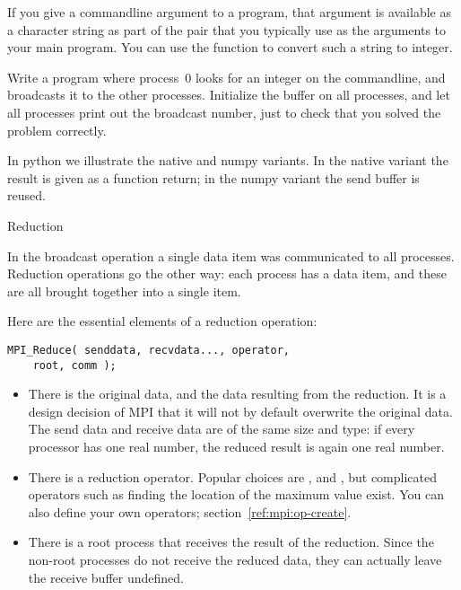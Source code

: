 

\begin{exercise}
  \label{ex:argv-bcast}
  If you give a commandline argument to a program, that argument is available
  as a character string as part of the  pair that you typically use
  as the arguments to your main program. You can use the function  to
  convert such a string to integer.

  Write a program where process~0 looks for an integer on the commandline, and
  broadcasts it to the other processes. Initialize the buffer on all processes, and
  let all processes print out the broadcast number,
  just to check that you solved the problem correctly.
\end{exercise}

In python we illustrate the native and numpy variants. In the native
variant the result is given as a function return; in the numpy variant
the send buffer is reused.
%

 {Reduction}

In the broadcast operation a single data item was communicated to all
processes. Reduction operations go the other way: each process has a
data item, and these are all brought together into a single item.

Here are the essential elements of a reduction operation:
\begin{verbatim}
MPI_Reduce( senddata, recvdata..., operator,
    root, comm ); 
\end{verbatim}
\begin{itemize}
\item There is the original data, and the data resulting from the
  reduction. It is a design decision of MPI that it will not by
  default overwrite the original data. The send data and receive data
  are of the same size and type: if every processor has one real
  number, the reduced result is again one real number.
\item There is a reduction operator. Popular choices are
  ,  and
  , but complicated operators such as finding
  the location of the maximum value exist. You can also define your
  own operators; section~\ref{ref:mpi:op-create}.
\item There is a root process that receives the result of the
  reduction. Since the non-root processes do not receive the reduced
  data, they can actually leave the receive buffer undefined.
\end{itemize}

